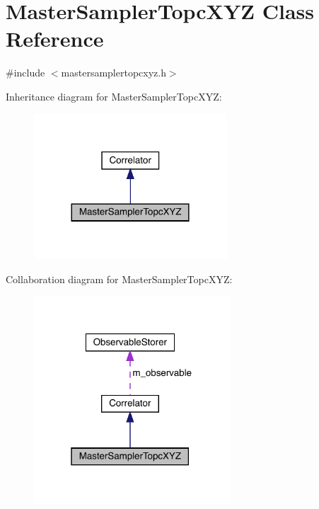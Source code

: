 \hypertarget{class_master_sampler_topc_x_y_z}{}\section{Master\+Sampler\+Topc\+X\+YZ Class Reference}
\label{class_master_sampler_topc_x_y_z}


{\ttfamily \#include $<$mastersamplertopcxyz.\+h$>$}



Inheritance diagram for Master\+Sampler\+Topc\+X\+YZ\+:\nopagebreak
\begin{figure}[H]
\begin{center}
\leavevmode
\includegraphics[width=204pt]{class_master_sampler_topc_x_y_z__inherit__graph}
\end{center}
\end{figure}


Collaboration diagram for Master\+Sampler\+Topc\+X\+YZ\+:\nopagebreak
\begin{figure}[H]
\begin{center}
\leavevmode
\includegraphics[width=208pt]{class_master_sampler_topc_x_y_z__coll__graph}
\end{center}
\end{figure}
